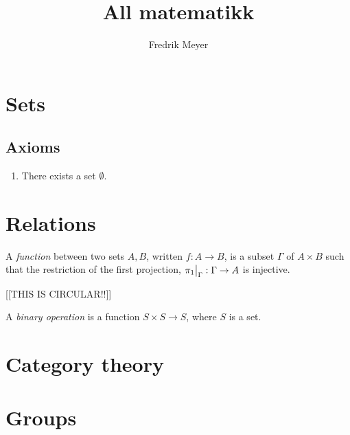 \documentclass[11pt, norsk]{book}
\begin{document}
\title{All matematikk}
\author{Fredrik Meyer}
\maketitle 

\chapter{Sets}
\section{Axioms}

\begin{enumerate}
\item There exists a set $\emptyset$.
\end{enumerate}

\chapter{Relations}

\begin{defi}
A \emph{function} between two sets $A,B$, written $f:A \to B$, is a subset $\Gamma$ of $A \times B$ such that the restriction of the first projection, $\restr{\pi_1}{\Gamma}:\Gamma \to A$ is injective.
\end{defi}
[[THIS IS CIRCULAR!!]]

\begin{defi}
A  \emph{binary operation} is a function $S \times S \to S$, where $S$ is a set.
\end{defi}

\chapter{Category theory}



\chapter{Groups}
\end{document}
